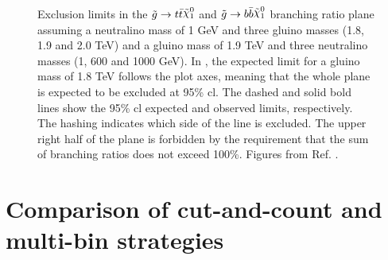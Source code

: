 \begin{figure}[htbp]
	\centering
	\caption{Exclusion limits in the $\gluino \to t \bar{t} \ninoone$ and $\gluino \to b \bar{b} \ninoone$
		branching ratio plane assuming  a neutralino mass of 1 GeV and three gluino masses 
		(1.8, 1.9 and 2.0 TeV) and  a gluino mass of 1.9 TeV and three neutralino masses (1, 600 and 1000 GeV). 
		In , the expected limit for a gluino mass of 1.8 TeV follows the plot axes, meaning that the whole plane is 
		expected to be excluded at 95\% \gls{cl}.
		The dashed and solid bold lines show the 95\% \gls{cl} expected and observed limits, respectively. The hashing indicates which side of the line 
		is excluded. The upper right half of the plane is forbidden by the requirement that the sum of branching ratios does not exceed 100\%.
		    Figures from Ref. \cite{Aaboud:2017hrg}.}
\end{figure}

\FloatBarrier

\section{Comparison of cut-and-count and multi-bin strategies}

